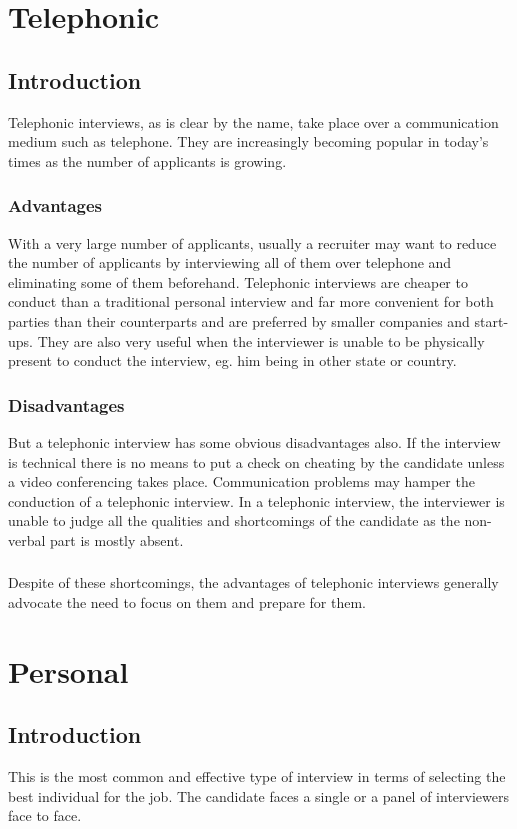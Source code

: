 \documentclass[a4paper,12pt]{report}
\begin{document}
\section{Telephonic}     %
\subsection{Introduction}  %
Telephonic interviews, as is clear by the name, take place over a communication medium such as telephone.
They are increasingly becoming popular in today's times as the number of applicants is growing.
\subsubsection{Advantages}
With a very large number of applicants, usually a recruiter may want to reduce the number of applicants by interviewing all of them over telephone and eliminating
some of them beforehand. Telephonic interviews are cheaper to conduct than a traditional personal interview and far more convenient
for both parties than their counterparts and are preferred by smaller companies and start-ups. They are also very useful when the interviewer is unable to be physically
present to conduct the interview, eg. him being in other state or country.
\subsubsection{Disadvantages}
But a telephonic interview has some obvious disadvantages also. If the interview is technical there is no
means to put a check on cheating by the candidate unless a video conferencing takes place. Communication problems
may hamper the conduction of a telephonic interview. In a telephonic interview, the interviewer is unable to
judge all the qualities and shortcomings of the candidate as the non-verbal part is mostly absent.
\subsubsection{}
Despite of these shortcomings, the advantages of telephonic interviews generally advocate the need to focus
on them and prepare for them.
\section{Personal}         %
\subsection{Introduction}  %
This is the most common and effective type of interview in terms of selecting the best individual for the job.
The candidate faces a single or a panel of interviewers face to face. 
\end{document}
